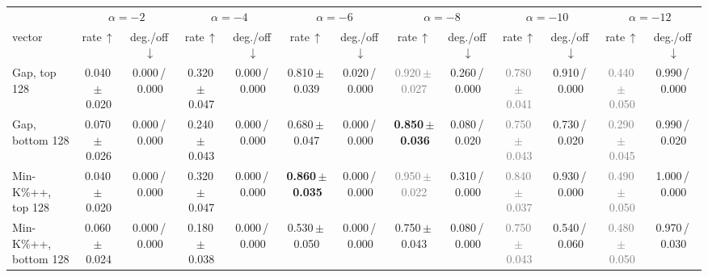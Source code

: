 \begin{tabular}{@{}lcccccccccccc@{}}
\toprule
& \multicolumn{2}{c}{$\alpha=-2$} & \multicolumn{2}{c}{$\alpha=-4$} & \multicolumn{2}{c}{$\alpha=-6$} & \multicolumn{2}{c}{$\alpha=-8$} & \multicolumn{2}{c}{$\alpha=-10$} & \multicolumn{2}{c}{$\alpha=-12$} \\
\cmidrule(lr){2-3}\cmidrule(lr){4-5}\cmidrule(lr){6-7}\cmidrule(lr){8-9}\cmidrule(lr){10-11}\cmidrule(lr){12-13}
vector & rate\,$\uparrow$ & deg./off\,$\downarrow$ & rate\,$\uparrow$ & deg./off\,$\downarrow$ & rate\,$\uparrow$ & deg./off\,$\downarrow$ & rate\,$\uparrow$ & deg./off\,$\downarrow$ & rate\,$\uparrow$ & deg./off\,$\downarrow$ & rate\,$\uparrow$ & deg./off\,$\downarrow$ \\
\midrule
Gap, top 128 & 0.040\,{\scriptsize$\pm$\,0.020} & {\scriptsize 0.000\,/\,0.000} & 0.320\,{\scriptsize$\pm$\,0.047} & {\scriptsize 0.000\,/\,0.000} & 0.810\,{\scriptsize$\pm$\,0.039} & {\scriptsize 0.020\,/\,0.000} & \textcolor{gray}{0.920\,{\scriptsize$\pm$\,0.027}} & {\scriptsize 0.260\,/\,0.000} & \textcolor{gray}{0.780\,{\scriptsize$\pm$\,0.041}} & {\scriptsize 0.910\,/\,0.000} & \textcolor{gray}{0.440\,{\scriptsize$\pm$\,0.050}} & {\scriptsize 0.990\,/\,0.000} \\
Gap, bottom 128 & 0.070\,{\scriptsize$\pm$\,0.026} & {\scriptsize 0.000\,/\,0.000} & 0.240\,{\scriptsize$\pm$\,0.043} & {\scriptsize 0.000\,/\,0.000} & 0.680\,{\scriptsize$\pm$\,0.047} & {\scriptsize 0.000\,/\,0.000} & \textbf{0.850\,{\scriptsize$\pm$\,0.036}} & {\scriptsize 0.080\,/\,0.020} & \textcolor{gray}{0.750\,{\scriptsize$\pm$\,0.043}} & {\scriptsize 0.730\,/\,0.020} & \textcolor{gray}{0.290\,{\scriptsize$\pm$\,0.045}} & {\scriptsize 0.990\,/\,0.020} \\
Min-K\%++, top 128 & 0.040\,{\scriptsize$\pm$\,0.020} & {\scriptsize 0.000\,/\,0.000} & 0.320\,{\scriptsize$\pm$\,0.047} & {\scriptsize 0.000\,/\,0.000} & \textbf{0.860\,{\scriptsize$\pm$\,0.035}} & {\scriptsize 0.000\,/\,0.000} & \textcolor{gray}{0.950\,{\scriptsize$\pm$\,0.022}} & {\scriptsize 0.310\,/\,0.000} & \textcolor{gray}{0.840\,{\scriptsize$\pm$\,0.037}} & {\scriptsize 0.930\,/\,0.000} & \textcolor{gray}{0.490\,{\scriptsize$\pm$\,0.050}} & {\scriptsize 1.000\,/\,0.000} \\
Min-K\%++, bottom 128 & 0.060\,{\scriptsize$\pm$\,0.024} & {\scriptsize 0.000\,/\,0.000} & 0.180\,{\scriptsize$\pm$\,0.038} & {\scriptsize 0.000\,/\,0.000} & 0.530\,{\scriptsize$\pm$\,0.050} & {\scriptsize 0.000\,/\,0.000} & 0.750\,{\scriptsize$\pm$\,0.043} & {\scriptsize 0.080\,/\,0.000} & \textcolor{gray}{0.750\,{\scriptsize$\pm$\,0.043}} & {\scriptsize 0.540\,/\,0.060} & \textcolor{gray}{0.480\,{\scriptsize$\pm$\,0.050}} & {\scriptsize 0.970\,/\,0.030} \\

\end{tabular}
